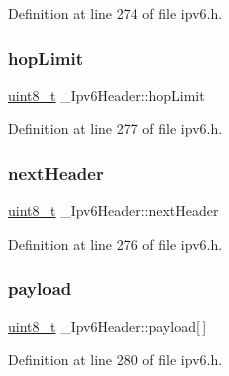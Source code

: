 Definition at line 274 of file ipv6.\+h.

\mbox{\label{struct__Ipv6Header_ae7bb526f594d326a50f49577156c99f1}} 
\subsubsection{\texorpdfstring{hop\+Limit}{hopLimit}}
{\footnotesize\ttfamily \hyperlink{stdint_8h_aba7bc1797add20fe3efdf37ced1182c5}{uint8\+\_\+t} \+\_\+\+Ipv6\+Header\+::hop\+Limit}



Definition at line 277 of file ipv6.\+h.

\mbox{\label{struct__Ipv6Header_ae290a2f4bfb2e71c34f65c572191f348}} 
\subsubsection{\texorpdfstring{next\+Header}{nextHeader}}
{\footnotesize\ttfamily \hyperlink{stdint_8h_aba7bc1797add20fe3efdf37ced1182c5}{uint8\+\_\+t} \+\_\+\+Ipv6\+Header\+::next\+Header}



Definition at line 276 of file ipv6.\+h.

\mbox{\label{struct__Ipv6Header_a45355cc11f1030193c3d57eeaa5ff015}} 
\subsubsection{\texorpdfstring{payload}{payload}}
{\footnotesize\ttfamily \hyperlink{stdint_8h_aba7bc1797add20fe3efdf37ced1182c5}{uint8\+\_\+t} \+\_\+\+Ipv6\+Header\+::payload\mbox{[}$\,$\mbox{]}}



Definition at line 280 of file ipv6.\+h.

\mbox{\label{struct__Ipv6Header_a8966ff7039b8c7c18cb69bcdac478a6a}} 

